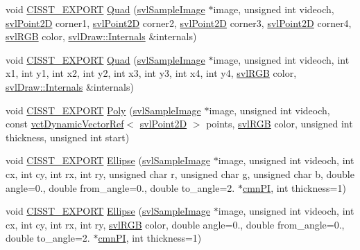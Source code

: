 \begin{DoxyCompactItemize}
void \hyperlink{cmn_export_macros_8h_a99393e0c3ac434b2605235bbe20684f8}{C\-I\-S\-S\-T\-\_\-\-E\-X\-P\-O\-R\-T} \hyperlink{namespacesvl_draw_a173abd1d3fd5668d8e21b3b1bab4bd79}{Quad} (\hyperlink{classsvl_sample_image}{svl\-Sample\-Image} $\ast$image, unsigned int videoch, \hyperlink{structsvl_point2_d}{svl\-Point2\-D} corner1, \hyperlink{structsvl_point2_d}{svl\-Point2\-D} corner2, \hyperlink{structsvl_point2_d}{svl\-Point2\-D} corner3, \hyperlink{structsvl_point2_d}{svl\-Point2\-D} corner4, \hyperlink{structsvl_r_g_b}{svl\-R\-G\-B} color, \hyperlink{classsvl_draw_1_1_internals}{svl\-Draw\-::\-Internals} \&internals)
\item 
void \hyperlink{cmn_export_macros_8h_a99393e0c3ac434b2605235bbe20684f8}{C\-I\-S\-S\-T\-\_\-\-E\-X\-P\-O\-R\-T} \hyperlink{namespacesvl_draw_ac97c2523e73434be76795dbf0ec71256}{Quad} (\hyperlink{classsvl_sample_image}{svl\-Sample\-Image} $\ast$image, unsigned int videoch, int x1, int y1, int x2, int y2, int x3, int y3, int x4, int y4, \hyperlink{structsvl_r_g_b}{svl\-R\-G\-B} color, \hyperlink{classsvl_draw_1_1_internals}{svl\-Draw\-::\-Internals} \&internals)
\item 
void \hyperlink{cmn_export_macros_8h_a99393e0c3ac434b2605235bbe20684f8}{C\-I\-S\-S\-T\-\_\-\-E\-X\-P\-O\-R\-T} \hyperlink{namespacesvl_draw_a45e9c0124dac457693ccef2333c1d863}{Poly} (\hyperlink{classsvl_sample_image}{svl\-Sample\-Image} $\ast$image, unsigned int videoch, const \hyperlink{classvct_dynamic_vector_ref}{vct\-Dynamic\-Vector\-Ref}$<$ \hyperlink{structsvl_point2_d}{svl\-Point2\-D} $>$ points, \hyperlink{structsvl_r_g_b}{svl\-R\-G\-B} color, unsigned int thickness, unsigned int start)
\item 
void \hyperlink{cmn_export_macros_8h_a99393e0c3ac434b2605235bbe20684f8}{C\-I\-S\-S\-T\-\_\-\-E\-X\-P\-O\-R\-T} \hyperlink{namespacesvl_draw_ab758055c8f92f86bb16b56c0615afb91}{Ellipse} (\hyperlink{classsvl_sample_image}{svl\-Sample\-Image} $\ast$image, unsigned int videoch, int cx, int cy, int rx, int ry, unsigned char r, unsigned char g, unsigned char b, double angle=0., double from\-\_\-angle=0., double to\-\_\-angle=2. $\ast$\hyperlink{cmn_constants_8h_aceb5aee49c7545745836d307b9b671ec}{cmn\-P\-I}, int thickness=1)
\item 
void \hyperlink{cmn_export_macros_8h_a99393e0c3ac434b2605235bbe20684f8}{C\-I\-S\-S\-T\-\_\-\-E\-X\-P\-O\-R\-T} \hyperlink{namespacesvl_draw_a70f8afc9c5d83e987b068b85455bf532}{Ellipse} (\hyperlink{classsvl_sample_image}{svl\-Sample\-Image} $\ast$image, unsigned int videoch, int cx, int cy, int rx, int ry, \hyperlink{structsvl_r_g_b}{svl\-R\-G\-B} color, double angle=0., double from\-\_\-angle=0., double to\-\_\-angle=2. $\ast$\hyperlink{cmn_constants_8h_aceb5aee49c7545745836d307b9b671ec}{cmn\-P\-I}, int thickness=1)

\end{DoxyCompactItemize}
